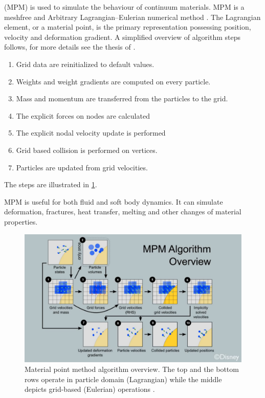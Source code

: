  (MPM) is used to simulate the behaviour of continuum materials. MPM is a meshfree and Arbitrary Lagrangian–Eulerian numerical method \cite{ALE}. The Lagrangian element, or a material point, is the primary representation possessing position, velocity and deformation gradient. A simplified overview of algorithm steps follows, for more details see the thesis of \citet{jiang2015material}.

\begin{enumerate}
    \item Grid data are reinitialized to default values.
    \item Weights and weight gradients are computed on every particle.
    \item Mass and momentum are transferred from the particles to the grid.
    \item The explicit forces on nodes are calculated
    \item The explicit nodal velocity update is performed
    \item Grid based collision is performed on vertices.
    \item Particles are updated from grid velocities.
\end{enumerate}
The steps are illustrated in \cref{fig:mpm}.

MPM is useful for both fluid and soft body dynamics. It can simulate deformation, fractures, heat transfer, melting and other changes of material properties.

\begin{figure}
\centering
\includegraphics[width=\textwidth]{img/MPM}
\caption{Material point method algorithm overview. The top and the bottom rows operate in particle domain (Lagrangian) while the middle depicts grid-based (Eulerian) operations \cite{disney}.
}
\label{fig:mpm}
\end{figure}

